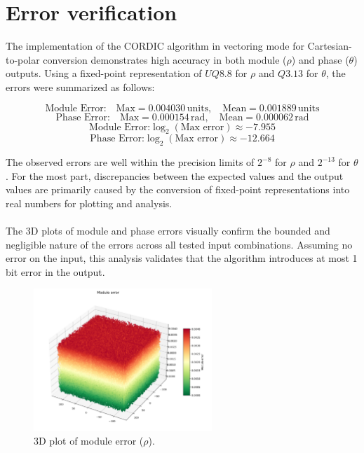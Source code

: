 \begin{code}
    \label{code:testbench_graph}
\end{code}

\section{Error verification}
The implementation of the CORDIC algorithm in vectoring mode for Cartesian-to-polar conversion demonstrates 
high accuracy in both module (\( \rho \)) and phase (\( \theta \)) outputs. Using a fixed-point 
representation of \( UQ8.8 \) for \( \rho \) and \( Q3.13 \) for \( \theta \), the errors were summarized as follows:

\[
\text{Module Error:} \quad \text{Max} = 0.004030 \, \text{units}, \quad \text{Mean} = 0.001889 \, \text{units}
\]
\[
\text{Phase Error:} \quad \text{Max} = 0.000154 \, \text{rad}, \quad \text{Mean} = 0.000062 \, \text{rad}
\]
\[
    \text{Module Error:} \log_2(\text{Max error}) \approx -7.955
\]
\[
    \text{Phase Error:} \log_2(\text{Max error}) \approx -12.664
\]

The observed errors are well within the precision limits of \( 2^{-8} \) for \( \rho \) and \( 2^{-13} \) for \( \theta \). For the most part, discrepancies between the expected values and the output values are primarily caused by the conversion of fixed-point representations into real numbers for plotting and analysis.
\\\\
The 3D plots of module and phase errors visually confirm the bounded and negligible nature of the errors across 
all tested input combinations. Assuming no error on the input, this analysis validates that the algorithm introduces 
at most 1 bit error in the output.

\begin{figure}[H]
    \centering
    \includegraphics[width=0.6\textwidth]{./images/Verification/module_error.png}
    \caption{3D plot of module error (\( \rho \)).}
    \label{fig:module_error}
\end{figure}

